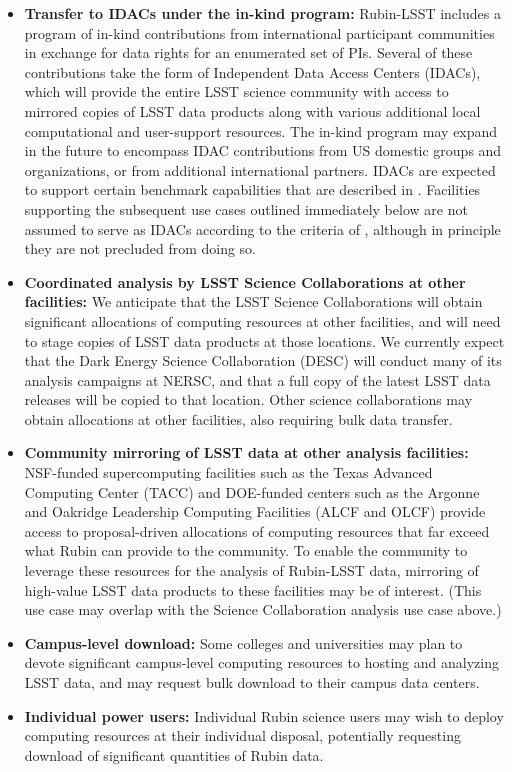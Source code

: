 \begin{itemize}
\item \textbf{Transfer to IDACs under the in-kind program:} Rubin-LSST includes a program of in-kind contributions from international participant communities in exchange for data rights for an enumerated set of PIs. Several of these contributions take the form of Independent Data Access Centers (IDACs), which will provide the entire LSST science community with access to mirrored copies of LSST data products along with various additional local computational and user-support resources. The in-kind program may expand in the future to encompass IDAC contributions from US domestic groups and organizations, or from additional international partners. IDACs are expected to support certain benchmark capabilities that are described in . Facilities supporting the subsequent use cases outlined immediately below are not assumed to serve as IDACs according to the criteria of , although in principle they are not precluded from doing so.
\item \textbf{Coordinated analysis by LSST Science Collaborations at other facilities:} We anticipate that the LSST Science Collaborations will obtain significant allocations of computing resources at other facilities, and will need to stage copies of LSST data products at those locations. We currently expect that the Dark Energy Science Collaboration (DESC) will conduct many of its analysis campaigns at NERSC, and that a full copy of the latest LSST data releases will be copied to that location. Other science collaborations may obtain allocations at other facilities, also requiring bulk data transfer.
\item \textbf{Community mirroring of LSST data at other analysis facilities:} NSF-funded supercomputing facilities such as the Texas Advanced Computing Center (TACC) and DOE-funded centers such as the Argonne and Oakridge Leadership Computing Facilities (ALCF and OLCF) provide access to proposal-driven allocations of computing resources that far exceed what Rubin can provide to the community. To enable the community to leverage these resources for the analysis of Rubin-LSST data, mirroring of high-value LSST data products to these facilities may be of interest. (This use case may  overlap with the Science Collaboration analysis use case above.)
\item \textbf{Campus-level download:} Some colleges and universities may plan to devote significant campus-level computing resources to hosting and analyzing LSST data, and may request bulk download to their campus data centers.
\item \textbf{Individual power users:} Individual Rubin science users may wish to deploy computing resources at their individual disposal, potentially requesting download of significant quantities of Rubin data.
\end{itemize}


